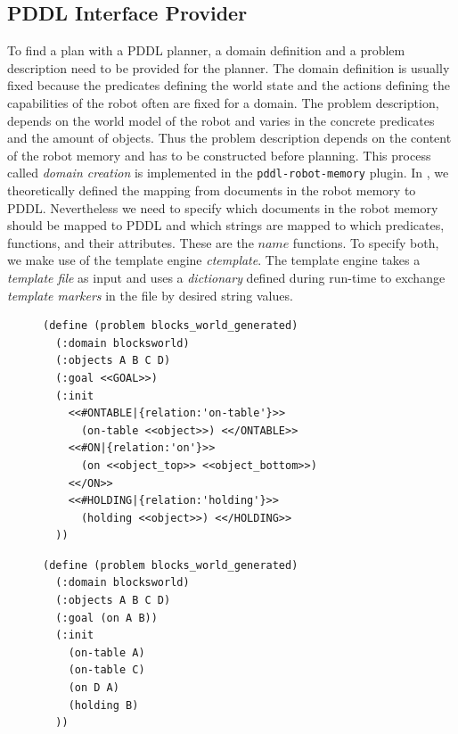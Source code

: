 \subsection{PDDL Interface Provider}
\label{sec:impl-pddl}
To find a plan with a PDDL planner, a domain definition and a problem
description need to be provided for the planner. The domain definition
is usually fixed because the predicates defining the world state and
the actions defining the capabilities of the robot often are fixed for
a domain. The problem description, depends on the world model of the
robot and varies in the concrete predicates and the amount of
objects. Thus the problem description depends on the content of the
robot memory and has to be constructed before planning. This process
called \emph{domain creation} is implemented in the
\texttt{pddl-robot-memory} plugin. In , we
theoretically defined the mapping from documents in the robot memory
to PDDL. Nevertheless we need to specify which documents in the robot
memory should be mapped to PDDL and which strings are mapped to which
predicates, functions, and their attributes. These are the $name$
functions. To specify both, we make use of the template engine
\emph{ctemplate}. The template engine takes a \emph{template file} as
input and uses a \emph{dictionary} defined during run-time to exchange
\emph{template markers} in the file by desired string values.
\begin{figure}
  \begin{minipage}{0.58\linewidth}
\begin{lstlisting}[style=SmallPDDL,
  caption={PDDL problem description template},
  label=lst:template,
  framexleftmargin=1pt, xleftmargin=1pt,
 morekeywords={}, numbers=none]
(define (problem blocks_world_generated)
  (:domain blocksworld)
  (:objects A B C D)
  (:goal <<GOAL>>)
  (:init
    <<#ONTABLE|{relation:'on-table'}>>
      (on-table <<object>>) <</ONTABLE>>
    <<#ON|{relation:'on'}>>
      (on <<object_top>> <<object_bottom>>)
    <</ON>>
    <<#HOLDING|{relation:'holding'}>>
      (holding <<object>>) <</HOLDING>>
  ))
\end{lstlisting}
  \end{minipage}
\hfill
  \begin{minipage}{0.42\linewidth}
\begin{lstlisting}[style=SmallPDDL,
  caption={Generated PDDL problem description},
  label=lst:pddl-gen,
  framexleftmargin=1pt, xleftmargin=1pt,
 morekeywords={}, numbers=none]
(define (problem blocks_world_generated)
  (:domain blocksworld)
  (:objects A B C D)
  (:goal (on A B))
  (:init
    (on-table A)
    (on-table C)
    (on D A)
    (holding B)
  ))
\end{lstlisting}
  \end{minipage}
  \vspace{-0.8cm}
\end{figure}
